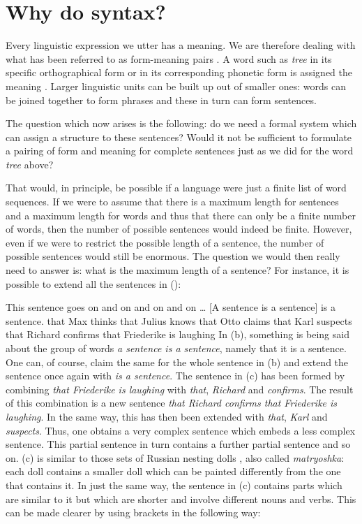 \section{Why do syntax?}
\label{sec-wozu-syntax}

Every linguistic expression we utter has a meaning. We are therefore dealing with
what has been referred to as form-meaning pairs \citep{Saussure16a-En}. A word such as \emph{tree}
in its specific orthographical form or in its corresponding phonetic form is assigned the
meaning . Larger linguistic units can be built up out of smaller ones: words can be
joined together to form phrases and these in turn can form sentences. 

The question which now arises is the following: do we need a formal system which can assign a
structure to these sentences? Would it not be sufficient to formulate a pairing of form and meaning for complete sentences
just as we did for the word \emph{tree} above?  

That would, in principle, be possible if a language were just a finite list of word sequences.  If
we were to assume that there is a maximum length for sentences and a maximum length for words and
thus that there can only be a finite number of words, then the number of possible sentences would
indeed be finite.  However, even if we were to restrict the possible length of a sentence, the
number of possible sentences would still be enormous.  The question we would then really need
to answer is: what is the maximum length of a sentence?  For instance, it is possible to extend all
the sentences in (): 

\eal 
\ex This sentence goes on and on and on and on \ldots 
\ex {}[A sentence is a sentence] is a sentence.
\ex\label{einbettung-dass-Saetze}
that Max thinks that Julius knows that Otto claims that Karl suspects that Richard confirms that Friederike is laughing
\zl
In (b), something is being said about the group of words \emph{a sentence is a sentence},
namely that it is a sentence. One can, of course, claim the same for the whole sentence in
(b) and extend the sentence once again with \emph{is a sentence}. The sentence in (c)
has been formed by combining \emph{that Friederike is laughing} with \emph{that}, \emph{Richard} and \emph{confirms}. The result
of this combination is a new sentence \emph{that Richard confirms that Friederike is laughing}. In
the same way, this has then been extended with \emph{that}, \emph{Karl} and \emph{suspects}. 
Thus, one obtains a very complex sentence which embeds a less complex sentence. 
This partial sentence in turn contains a further partial sentence and so on.
(c) is similar to those sets of Russian nesting dolls%
, also called \emph{matryoshka}: each doll contains
a smaller doll which can be painted differently from the one that contains it. In just the same way,
the sentence in (c) contains parts which are similar to it but which are shorter and involve different nouns and verbs. This can be made clearer by using brackets in the following way: 


